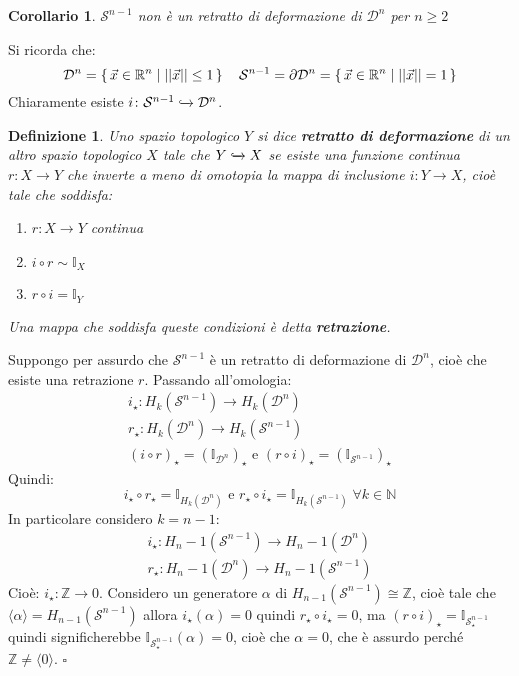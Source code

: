 \documentclass[10pt, twoside=false, x11names]{scrbook}
\newtheorem{corollary}[theorem]{Corollario}
\newtheorem{definition}[theorem]{Definizione}
\newenvironment{proof}{{\textbf{Dimostrazione}:}}{\hfill $\square$}
\newcommand{\Z}{\mathbb{Z}}
\newcommand{\RN}[1][]{\mathbb{R}^#1}
\newcommand{\Id}[1][]{\mathbb{I}_#1}
\newcommand{\Sph}[1][]{\mathcal{S}^#1}
\newcommand{\Disk}[1][]{\mathcal{D}^#1}
\newcommand{\incl}{\xhookrightarrow{}}
\begin{document}
\begin{corollary}
  $ \Sph{n-1} $ non è un retratto di deformazione di $ \Disk{n} $ per $ n \geq 2 $
\end{corollary}
\begin{proof}
  Si ricorda che:
  \[
    \Disk{n} = \set{ \vec{x} \in \RN{n} | || \vec{x} || \leq 1} \quad \Sph{n-1} = \partial \Disk{n} = \set{ \vec{x} \in \RN{n} | || \vec{x} || = 1}
  \]
  Chiaramente esiste $ i \colon \Sph{n-1} \incl \Disk{n} $.
  \begin{definition}
    Uno spazio topologico $ Y $ si dice \textbf{retratto di deformazione} di un altro
    spazio topologico $ X $ tale che $ Y \incl X $ se esiste una funzione continua $ r\colon X \to Y $ che inverte a meno di omotopia
    la mappa di inclusione $ i\colon Y \to X $, cioè tale che soddisfa:
    \begin{enumerate}
    \item $ r\colon X \to Y $ continua
    \item $ i \circ r \sim \Id{X} $
    \item $ r \circ i = \Id{Y} $
    \end{enumerate}
    Una mappa che soddisfa queste condizioni è detta \textbf{retrazione}.
  \end{definition}
  Suppongo per assurdo che $ \Sph{n-1} $ è un retratto di deformazione di $ \Disk{n} $, cioè che
  esiste una retrazione $ r $. Passando all'omologia:
  \begin{gather*}
    i_\star \colon H_k(\Sph{n-1}) \to H_k(\Disk{n}) \\
    r_\star \colon H_k(\Disk{n}) \to H_k(\Sph{n-1}) \\
    \left( i \circ r \right)_\star = (\Id{\Disk{n}})_\star \text{ e }  \left( r \circ i \right)_\star = (\Id{\Sph{n-1}})_\star
  \end{gather*}
  Quindi:
  \[
    i_\star \circ r_\star = \Id{H_k(\Disk{n})} \text{ e } r_\star \circ i_\star = \Id{H_k(\Sph{n-1})} \; \forall k \in \mathbb{N}
  \]
  In particolare considero $ k = n - 1 $:
  \begin{gather*}
    i_\star \colon H_n-1(\Sph{n-1}) \to H_n-1(\Disk{n}) \\
    r_\star \colon H_n-1(\Disk{n}) \to H_n-1(\Sph{n-1})
  \end{gather*}
  Cioè: $ i_\star \colon \Z \to 0 $. Considero un generatore $ \alpha $ di $ H_{n-1}(\Sph{n-1}) \cong \Z $, cioè tale
  che $ \langle\alpha\rangle = H_{n-1}(\Sph{n-1}) $ allora $ i_\star(\alpha) = 0 $ quindi $ r_\star \circ i_\star = 0 $, ma
  $ \left( r \circ i \right)_\star = \Id{\Sph{n-1}_\star} $ quindi significherebbe $ \Id{\Sph{n-1}_\star}(\alpha) = 0 $,
  cioè che $ \alpha = 0 $, che è assurdo perché $ \Z \not = \langle0\rangle $.
\end{proof}
\end{document}
